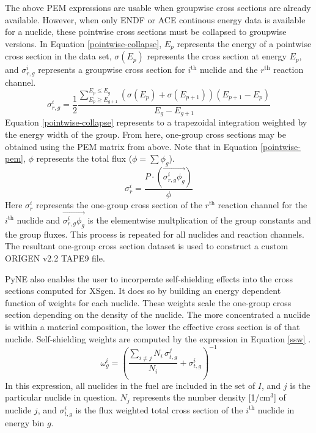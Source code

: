 \documentclass{article}
\begin{document}
The above PEM expressions are usable when groupwise cross sections are already available.
However, when only ENDF or ACE continous energy data is available for a nuclide, these pointwise
cross sections must be collapsed to groupwise versions.
In Equation \ref{pointwise-collapse}, $E_p$ represents the energy of a pointwise cross section
in the data set,
$\sigma(E_p)$ represents the cross section at energy $E_p$, and $\sigma_{r,g}^i$ represents a
groupwise cross section for $i^\mathrm{th}$ nuclide and the $r^\mathrm{th}$ reaction channel.
\begin{equation}
\label{pointwise-collapse}
\sigma_{r,g}^i = \frac{1}{2} \frac{\sum_{E_p\ge E_{g+1}}^{E_p\le E_g}
                                   \left(\sigma(E_p)+\sigma(E_{p+1})\right)
                                   \left(E_{p+1}-E_{p}\right)}
                                  {E_g-E_{g+1}}
\end{equation}
Equation \ref{pointwise-collapse} represents to a trapezoidal integration weighted by the
energy width of the group. From here, one-group cross sections may be obtained using the PEM
matrix from above. Note that in Equation \ref{pointwise-pem}, $\phi$ represents the total
flux ($\phi=\sum\phi_g$).
\begin{equation}
\label{pointwise-pem}
\sigma_{r}^i=\frac{P \cdot (\overrightarrow{\sigma_{r,g}^i \phi_g})}{\phi}
\end{equation}
Here $\sigma_{r}^i$ represents the one-group cross section of the $r^\mathrm{th}$ reaction
channel for the $i^\mathrm{th}$ nuclide and $\overrightarrow{\sigma_{r,g}^i \phi_g}$ is the
elementwise multplication of the group constants and the group fluxes.
This process is repeated for all nuclides and reaction channels. The resultant one-group
cross section dataset is used to construct a custom ORIGEN v2.2 TAPE9 file\cite{origen2}.

PyNE also enables the user to incorperate self-shielding effects \cite{bondarenko} into the cross sections
computed for XSgen. It does so by building an energy dependent function of weights for each
nuclide. These weights scale the one-group cross section depending on the density of the
nuclide. The more concentrated a nuclide is within a material composition, the lower the
effective cross section is of that nuclide. Self-shielding weights are computed by the
expression in Equation \ref{ssw} \cite{weights}.
\begin{equation}
\label{ssw}
\omega_{g}^i=\left(\frac{\sum_{i\neq j}N_i \, \sigma_{t,g}^j}{N_i}+\sigma_{t,g}^i\right)^{-1}
\end{equation}
In this expression, all nuclides in the fuel are included in the set of $I$, and $j$ is
the particular nuclide in question. $N_j$ represents the number density [1/cm$^3$] of
nuclide $j$, and $\sigma_{t,g}^i$ is the flux weighted total cross section of
the $i^\mathrm{th}$ nuclide in energy bin $g$.
\end{document}
